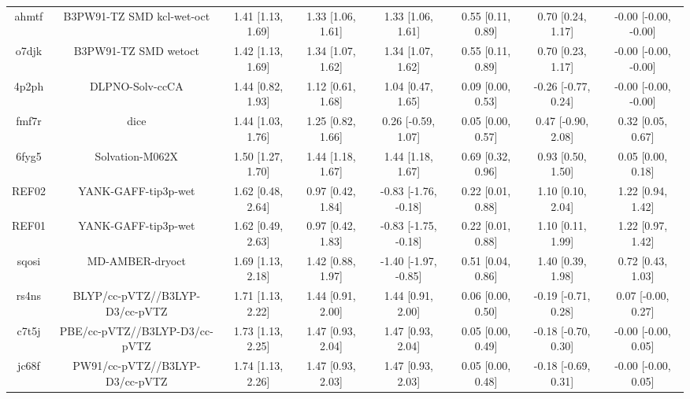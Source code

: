 \documentclass{article}
\begin{document}
\begin{center}
\begin{longtable}{|cccccccc|}
 ahmtf &                          B3PW91-TZ SMD kcl-wet-oct &  1.41 [1.13, 1.69] &  1.33 [1.06, 1.61] &     1.33 [1.06, 1.61] &  0.55 [0.11, 0.89] &    0.70 [0.24, 1.17] &  -0.00 [-0.00, -0.00] \\
 o7djk &                               B3PW91-TZ SMD wetoct &  1.42 [1.13, 1.69] &  1.34 [1.07, 1.62] &     1.34 [1.07, 1.62] &  0.55 [0.11, 0.89] &    0.70 [0.23, 1.17] &  -0.00 [-0.00, -0.00] \\
 4p2ph &                                    DLPNO-Solv-ccCA &  1.44 [0.82, 1.93] &  1.12 [0.61, 1.68] &     1.04 [0.47, 1.65] &  0.09 [0.00, 0.53] &  -0.26 [-0.77, 0.24] &  -0.00 [-0.00, -0.00] \\
 fmf7r &                                               dice &  1.44 [1.03, 1.76] &  1.25 [0.82, 1.66] &    0.26 [-0.59, 1.07] &  0.05 [0.00, 0.57] &   0.47 [-0.90, 2.08] &     0.32 [0.05, 0.67] \\
 6fyg5 &                                    Solvation-M062X &  1.50 [1.27, 1.70] &  1.44 [1.18, 1.67] &     1.44 [1.18, 1.67] &  0.69 [0.32, 0.96] &    0.93 [0.50, 1.50] &     0.05 [0.00, 0.18] \\
 REF02 &                                YANK-GAFF-tip3p-wet &  1.62 [0.48, 2.64] &  0.97 [0.42, 1.84] &  -0.83 [-1.76, -0.18] &  0.22 [0.01, 0.88] &    1.10 [0.10, 2.04] &     1.22 [0.94, 1.42] \\
 REF01 &                                YANK-GAFF-tip3p-wet &  1.62 [0.49, 2.63] &  0.97 [0.42, 1.83] &  -0.83 [-1.75, -0.18] &  0.22 [0.01, 0.88] &    1.10 [0.11, 1.99] &     1.22 [0.97, 1.42] \\
 sqosi &                                    MD-AMBER-dryoct &  1.69 [1.13, 2.18] &  1.42 [0.88, 1.97] &  -1.40 [-1.97, -0.85] &  0.51 [0.04, 0.86] &    1.40 [0.39, 1.98] &     0.72 [0.43, 1.03] \\
 rs4ns &                     BLYP/cc-pVTZ//B3LYP-D3/cc-pVTZ &  1.71 [1.13, 2.22] &  1.44 [0.91, 2.00] &     1.44 [0.91, 2.00] &  0.06 [0.00, 0.50] &  -0.19 [-0.71, 0.28] &    0.07 [-0.00, 0.27] \\
 c7t5j &                      PBE/cc-pVTZ//B3LYP-D3/cc-pVTZ &  1.73 [1.13, 2.25] &  1.47 [0.93, 2.04] &     1.47 [0.93, 2.04] &  0.05 [0.00, 0.49] &  -0.18 [-0.70, 0.30] &   -0.00 [-0.00, 0.05] \\
 jc68f &                     PW91/cc-pVTZ//B3LYP-D3/cc-pVTZ &  1.74 [1.13, 2.26] &  1.47 [0.93, 2.03] &     1.47 [0.93, 2.03] &  0.05 [0.00, 0.48] &  -0.18 [-0.69, 0.31] &   -0.00 [-0.00, 0.05] \\

\end{longtable}
\end{center}
\end{document}
